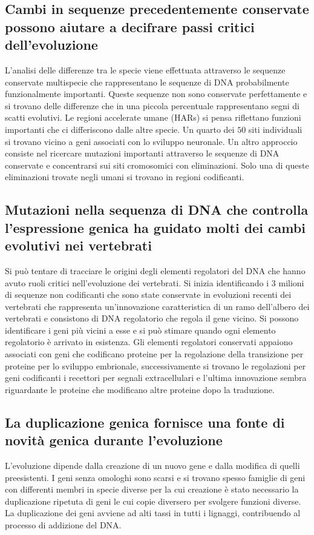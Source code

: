 \subsection{Cambi in sequenze precedentemente conservate possono aiutare a decifrare passi critici dell'evoluzione}
L'analisi delle differenze tra le specie viene effettuata attraverso le sequenze conservate multispecie che rappresentano le sequenze di DNA probabilmente funzionalmente importanti. 
Queste sequenze non sono conservate perfettamente e si trovano delle differenze che in una piccola percentuale rappresentano segni di scatti evolutivi. Le regioni accelerate umane
(HARs) si pensa riflettano funzioni importanti che ci differiscono dalle altre specie. Un quarto dei $50$ siti individuali si trovano vicino a geni associati con lo sviluppo neuronale. 
Un altro approccio consiste nel ricercare mutazioni importanti attraverso le sequenze di DNA conservate e concentrarsi sui siti cromosomici con eliminazioni. Solo una di queste 
eliminazioni trovate negli umani si trovano in regioni codificanti. 
\subsection{Mutazioni nella sequenza di DNA che controlla l'espressione genica ha guidato molti dei cambi evolutivi nei vertebrati}
Si pu\`o tentare di tracciare le origini degli elementi regolatori del DNA che hanno avuto ruoli critici nell'evoluzione dei vertebrati. Si inizia identificando i $3$ milioni di sequenze
non codificanti che sono state conservate in evoluzioni recenti dei vertebrati che rappresenta un'innovazione caratteristica di un ramo dell'albero dei vertebrati e consistono di DNA
regolatorio che regola il gene vicino. Si possono identificare i geni pi\`u vicini a esse e si pu\`o stimare quando ogni elemento regolatorio \`e arrivato in esistenza. Gli elementi 
regolatori conservati appaiono associati con geni che codificano proteine per la regolazione della transizione per proteine per lo sviluppo embrionale, successivamente si trovano le
regolazioni per geni codificanti i recettori per segnali extracellulari e l'ultima innovazione sembra riguardante le proteine che modificano altre proteine dopo la traduzione. 
\subsection{La duplicazione genica fornisce una fonte di novit\`a genica durante l'evoluzione}
L'evoluzione dipende dalla creazione di un nuovo gene e dalla modifica di quelli preesistenti. I geni senza omologhi sono scarsi e si trovano spesso famiglie di geni con differenti 
membri in specie diverse per la cui creazione \`e stato necessario la duplicazione ripetuta di geni le cui copie diversero per svolgere funzioni diverse. La  duplicazione dei geni 
avviene ad alti tassi in tutti i lignaggi, contribuendo al processo di addizione del DNA. 
